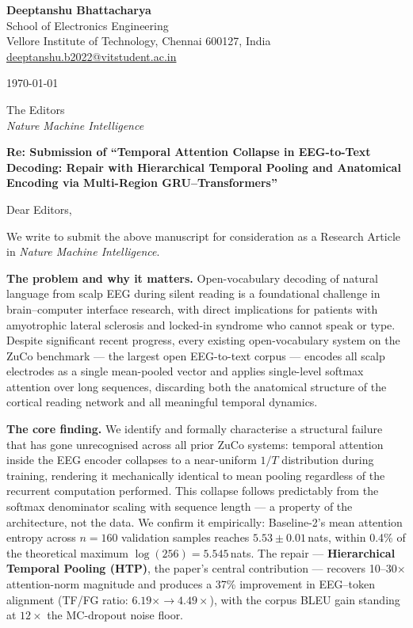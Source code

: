 \documentclass[12pt]{article}
\begin{document}
\textbf{Deeptanshu Bhattacharya}\\
School of Electronics Engineering\\
Vellore Institute of Technology, Chennai 600127, India\\
\href{mailto:deeptanshu.b2022@vitstudent.ac.in}{deeptanshu.b2022@vitstudent.ac.in}

\bigskip
\today

\bigskip
The Editors\\
\textit{Nature Machine Intelligence}

\bigskip
\textbf{Re: Submission of ``Temporal Attention Collapse in EEG-to-Text Decoding:
Repair with Hierarchical Temporal Pooling and Anatomical Encoding via
Multi-Region GRU--Transformers''}

\bigskip
Dear Editors,

We write to submit the above manuscript for consideration as a Research Article
in \textit{Nature Machine Intelligence}.

\textbf{The problem and why it matters.}
Open-vocabulary decoding of natural language from scalp EEG during silent
reading is a foundational challenge in brain--computer interface research,
with direct implications for patients with amyotrophic lateral sclerosis and
locked-in syndrome who cannot speak or type.
Despite significant recent progress, every existing open-vocabulary system
on the ZuCo benchmark — the largest open EEG-to-text corpus — encodes all
scalp electrodes as a single mean-pooled vector and applies single-level
softmax attention over long sequences, discarding both the anatomical
structure of the cortical reading network and all meaningful temporal dynamics.

\textbf{The core finding.}
We identify and formally characterise a structural failure that has gone
unrecognised across all prior ZuCo systems: temporal attention inside the EEG
encoder collapses to a near-uniform $1/T$ distribution during training,
rendering it mechanically identical to mean pooling regardless of the recurrent
computation performed.
This collapse follows predictably from the softmax denominator scaling with
sequence length — a property of the architecture, not the data.
We confirm it empirically: Baseline-2's mean attention entropy across
$n{=}160$ validation samples reaches $5.53 \pm 0.01$\,nats, within 0.4\%
of the theoretical maximum $\log(256){=}5.545$\,nats.
The repair — \textbf{Hierarchical Temporal Pooling (HTP)}, the paper's
central contribution — recovers 10--30$\times$ attention-norm magnitude and
produces a 37\% improvement in EEG--token alignment (TF/FG ratio: $6.19\times
\to 4.49\times$), with the corpus BLEU gain standing at $12\times$ the
MC-dropout noise floor.
\end{document}
